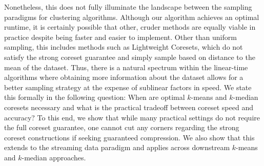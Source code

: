 Nonetheless, this does not fully illuminate the landscape between the sampling paradigms for clustering algorithms. Although our algorithm achieves an optimal
runtime, it is certainly possible that other, cruder methods are equally viable in practice despite being faster and easier to implement. Other than uniform
sampling, this includes methods such as Lightweight Coresets, which do not satisfy the strong coreset guarantee and simply sample based on distance to the mean
of the dataset. Thus, there is a natural spectrum within the linear-time algorithms where obtaining more information about the dataset allows for a better
sampling strategy at the expense of sublinear factors in speed. We state this formally in the following question: When are optimal $k$-means and $k$-median
coresets necessary and what is the practical tradeoff between coreset speed and accuracy? To this end, we show that while many practical settings do not require
the full coreset guarantee, one cannot cut any corners regarding the strong coreset constructions if seeking guaranteed compression. We also show that this
extends to the streaming data paradigm and applies across downstream $k$-means and $k$-median approaches.
